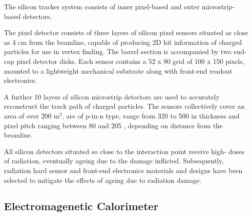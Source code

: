 

The silicon tracker system consists of inner pixel-based and outer microstrip-
based detectors.

The pixel detector consists of three layers of silicon pixel sensors situated 
as close as 4 cm from the beamline, capable 
of producing 2D hit information of charged particles for use in vertex 
finding. The barrel section is accompanied by two end-cap pixel detector 
disks. Each sensor contains a 52 x 80 grid of 100 \microm x 150 \microm pixels, 
mounted to a lightweight mechanical substrate along with front-end readout 
electronics.

A further 10 layers of silicon microstrip detectors are used to accurately 
reconstruct the track path of charged particles. The sensors collectively cover 
an area of over 200 $\text{m}^2$, are of p-in-n type, range from 320 \microm
to 500 \microm in thickness and pixel pitch ranging between 80 \microm and 
205 \microm, depending on distance from the beamline.

All silicon detectors situated so close to the interaction point receive high-
doses of radiation, eventually ageing due to the damage inflicted. Subsequently, 
radiation hard sensor and front-end electronics materials and designs have been
selected to mitigate the effects of ageing due to radiation damage.

\subsection{Electromagenetic Calorimeter}



